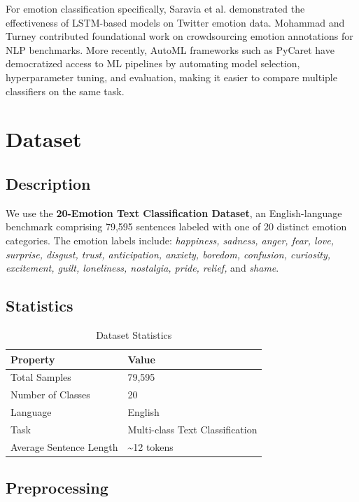 \documentclass{article}
\begin{document}
For emotion classification specifically, Saravia et al. \cite{saravia2018carer} demonstrated the effectiveness of LSTM-based models on Twitter emotion data. Mohammad and Turney \cite{mohammad2013crowdsourcing} contributed foundational work on crowdsourcing emotion annotations for NLP benchmarks. More recently, AutoML frameworks such as PyCaret \cite{ali2020pycaret} have democratized access to ML pipelines by automating model selection, hyperparameter tuning, and evaluation, making it easier to compare multiple classifiers on the same task.

\section{Dataset}

\subsection{Description}

We use the \textbf{20-Emotion Text Classification Dataset}, an English-language benchmark comprising 79,595 sentences labeled with one of 20 distinct emotion categories. The emotion labels include: \textit{happiness, sadness, anger, fear, love, surprise, disgust, trust, anticipation, anxiety, boredom, confusion, curiosity, excitement, guilt, loneliness, nostalgia, pride, relief,} and \textit{shame}.

\subsection{Statistics}

\begin{table}[H]
\centering
\caption{Dataset Statistics}
\begin{tabular}{ll}
\toprule
\textbf{Property} & \textbf{Value} \\
\midrule
Total Samples & 79,595 \\
Number of Classes & 20 \\
Language & English \\
Task & Multi-class Text Classification \\
Average Sentence Length & \textasciitilde{}12 tokens \\
\bottomrule
\end{tabular}
\end{table}

\subsection{Preprocessing}
\end{document}
